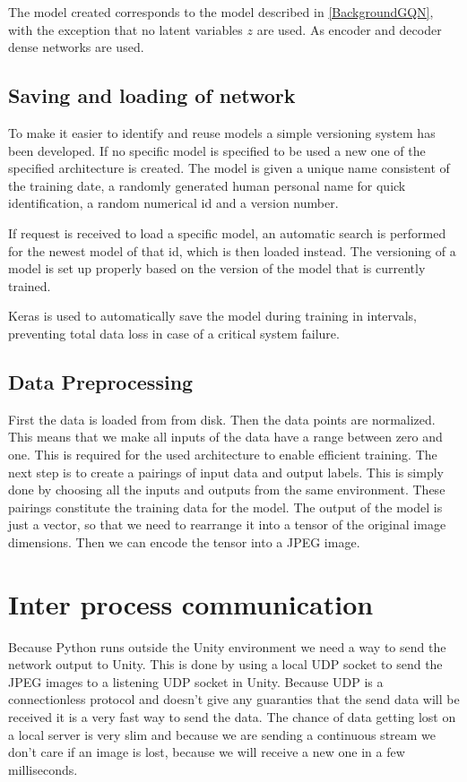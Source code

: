 The model created corresponds to the model described in \cref{BackgroundGQN}, with the exception that no latent variables $z$ are used. As encoder and decoder dense networks are used.


\subsection{Saving and loading of network}
To make it easier to identify and reuse models a simple versioning system has been developed. If no specific model is specified to be used a new one of the specified architecture is created. The model is given a unique name consistent of the training date, a randomly generated human personal name for quick identification, a random numerical id and a version number.

If request is received to load a specific model, an automatic search is performed for the newest model of that id, which is then loaded instead. The versioning of a model is set up properly based on the version of the model that is currently trained.

Keras is used to automatically save the model during training in intervals, preventing total data loss in case of a critical system failure.


\subsection{Data Preprocessing}
First the data is loaded from from disk. Then the data points are normalized. This means that we make all inputs of the data have a range between zero and one. This is required for the used architecture to enable efficient training. The next step is to create a pairings of input data and output labels. This is simply done by choosing all the inputs and outputs from the same environment. These pairings constitute the training data for the model. The output of the model is just a vector, so that we need to rearrange it into a tensor of the original image dimensions. Then we can encode the tensor into a JPEG image.


\section[IPC]{Inter process communication}
Because Python runs outside the Unity environment we need a way to send the network output to Unity. This is done by using a local UDP socket to send the JPEG images to a listening UDP socket in Unity. Because UDP is a connectionless protocol and doesn't give any guaranties that the send data will be received it is a very fast way to send the data. The chance of data getting lost on a local server is very slim and because we are sending a continuous stream we don't care if an image is lost, because we will receive a new one in a few milliseconds.


